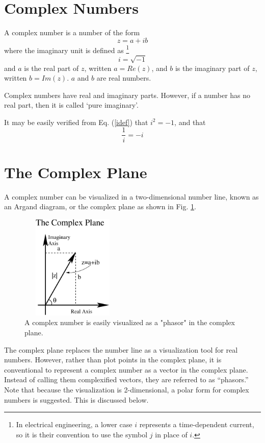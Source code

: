 \section{Complex Numbers}
A complex number is a number of the form
\begin{equation}
z = a + i b
\label{zrect}
\end{equation}
where the imaginary unit is defined as
\footnote{In electrical engineering,
a lower case $i$ represents a time-dependent current, so it is
their convention to use the symbol $j$ in place of $i$.}
\begin{equation}
i = \sqrt{-1}
\label{idef}
\end{equation}
and $a$ is the real part of $z$, written $a = Re(z)$, and $b$ is the 
imaginary part of $z$, written $b = Im(z)$.     $a$ and
$b$ are real numbers. 

Complex numbers have real and imaginary parts.
However, if a number has no real part, then it is called
`pure imaginary'.


It may be easily verified 
from Eq. (\ref{idef}) that $i^2 = -1$, and that
\begin{equation}
\frac{1}{i} = -i
\end{equation}

\section{The Complex Plane}
A complex number can be visualized in a
two-dimensional number line, known as an 
Argand diagram, or the complex plane
as shown in Fig. \ref{argand}.
\begin{figure}
\begin{center}
\includegraphics[width=5cm,height=5cm]{images/argand.eps}
\caption[The Complex Plane]{A complex number is easily visualized as
a "phasor" in the complex plane.}
\label{argand}
\end{center}
\end{figure}
The complex plane replaces the number line as a visualization
tool for real numbers.  However, rather than plot points
in the complex plane, it is conventional to represent
a complex number as a vector in the complex plane.  Instead
of calling them complexified vectors, they are referred to
as ``phasors.''  Note 
that because the visualization
is 2-dimensional, a polar form for complex numbers is suggested.
This is discussed below.%


